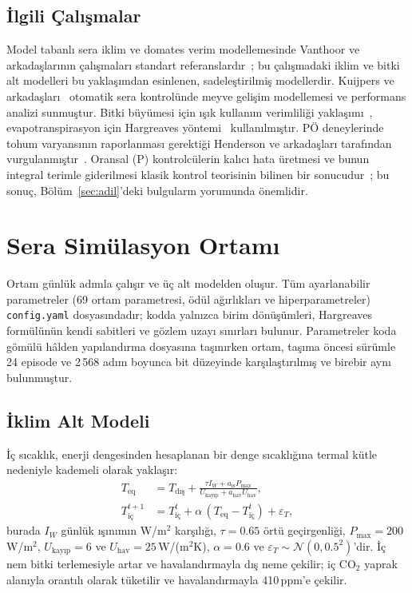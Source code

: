 \documentclass[conference,a4paper]{IEEEtran}
\newcommand{\cfg}[1]{\texttt{#1}}
\begin{document}
\subsection{İlgili Çalışmalar}
Model tabanlı sera iklim ve domates verim modellemesinde Vanthoor ve arkadaşlarının çalışmaları standart referanslardır~\cite{vanthoor2011a,vanthoor2011b}; bu çalışmadaki iklim ve bitki alt modelleri bu yaklaşımdan esinlenen, sadeleştirilmiş modellerdir. Kuijpers ve arkadaşları~\cite{kuijpers2021} otomatik sera kontrolünde meyve gelişim modellemesi ve performans analizi sunmuştur. Bitki büyümesi için ışık kullanım verimliliği yaklaşımı~\cite{monteith1977}, evapotranspirasyon için Hargreaves yöntemi~\cite{hargreaves1985} kullanılmıştır. PÖ deneylerinde tohum varyansının raporlanması gerektiği Henderson ve arkadaşları tarafından vurgulanmıştır~\cite{henderson2018}. Oransal (P) kontrolcülerin kalıcı hata üretmesi ve bunun integral terimle giderilmesi klasik kontrol teorisinin bilinen bir sonucudur~\cite{astrom2006}; bu sonuç, Bölüm~\ref{sec:adil}'deki bulguların yorumunda önemlidir.

\section{Sera Simülasyon Ortamı}
\label{sec:ortam}
Ortam günlük adımla çalışır ve üç alt modelden oluşur. Tüm ayarlanabilir parametreler (69 ortam parametresi, ödül ağırlıkları ve hiperparametreler) \cfg{config.yaml} dosyasındadır; kodda yalnızca birim dönüşümleri, Hargreaves formülünün kendi sabitleri ve gözlem uzayı sınırları bulunur. Parametreler koda gömülü hâlden yapılandırma dosyasına taşınırken ortam, taşıma öncesi sürümle 24 episode ve 2\,568 adım boyunca bit düzeyinde karşılaştırılmış ve birebir aynı bulunmuştur.

\subsection{İklim Alt Modeli}
İç sıcaklık, enerji dengesinden hesaplanan bir denge sıcaklığına termal kütle nedeniyle kademeli olarak yaklaşır:
\begin{align}
T_{\mathrm{eq}} &= T_{\text{dış}}+\frac{\tau I_W + a_{\text{ıs}}P_{\max}}{U_{\text{kayıp}}+a_{\mathrm{hav}}U_{\mathrm{hav}}},\\
T_{\text{iç}}^{t+1} &= T_{\text{iç}}^{t}+\alpha\,(T_{\mathrm{eq}}-T_{\text{iç}}^{t})+\varepsilon_T,
\end{align}
burada $I_W$ günlük ışınımın W/m$^2$ karşılığı, $\tau=0.65$ örtü geçirgenliği, $P_{\max}=200$\,W/m$^2$, $U_{\text{kayıp}}=6$ ve $U_{\mathrm{hav}}=25$\,W/(m$^2$K), $\alpha=0.6$ ve $\varepsilon_T\sim\mathcal{N}(0,0.5^2)$'dir. İç nem bitki terlemesiyle artar ve havalandırmayla dış neme çekilir; iç CO$_2$ yaprak alanıyla orantılı olarak tüketilir ve havalandırmayla 410\,ppm'e çekilir.
\end{document}
